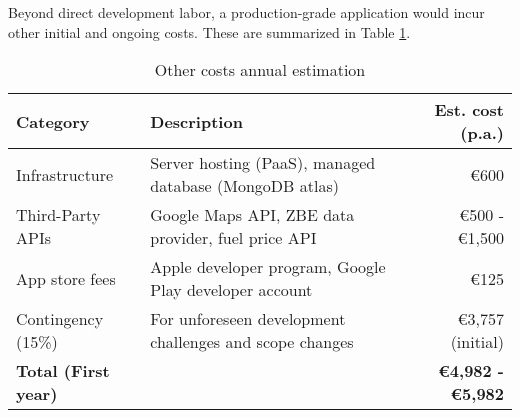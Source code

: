 Beyond direct development labor, a production-grade application would incur other initial and ongoing costs. These are summarized in Table \ref{tab:other_costs}.

\begin{table}[H]
\normalsize
\centering
\caption{Other costs annual estimation}
\label{tab:other_costs}
\begin{tabular}{l|p{6.6cm}|r}
\hline
\textbf{Category} & \textbf{Description} & \textbf{Est. cost (p.a.)} \\
\hline
Infrastructure & Server hosting (PaaS), managed database (MongoDB atlas) & €600 \\
Third-Party APIs & Google Maps API, ZBE data provider, fuel price API & €500 - €1,500 \\
App store fees & Apple developer program, Google Play developer account & €125 \\
Contingency (15\%) & For unforeseen development challenges and scope changes & €3,757 (initial) \\
\hline
\textbf{Total (First year)} & & \textbf{€4,982 - €5,982} \\
\hline
\end{tabular}
\end{table}

\textgap
